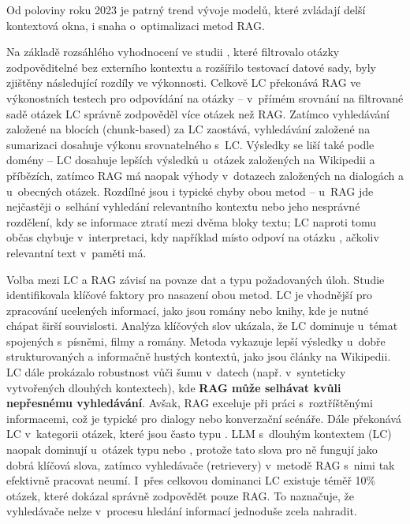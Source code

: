 \documentclass[czech, bc, kiv, he, iso690numb, pdf]{fasthesis}
\begin{document}
Od poloviny roku 2023 je patrný trend vývoje modelů, které zvládají delší kontextová okna, i snaha o~optimalizaci metod RAG.

Na základě rozsáhlého vyhodnocení ve studii \cite{rag-vs-lc-eval}, které filtrovalo otázky zodpověditelné bez externího kontextu a rozšířilo testovací datové sady, byly zjištěny následující rozdíly ve výkonnosti. Celkově LC překonává RAG ve výkonostních testech pro odpovídání na otázky -- v~přímém srovnání na filtrované sadě otázek LC správně zodpověděl více otázek než RAG. Zatímco vyhledávání založené na blocích (chunk-based) za LC zaostává, vyhledávání založené na sumarizaci dosahuje výkonu srovnatelného s~LC. Výsledky se liší také podle domény -- LC dosahuje lepších výsledků u~otázek založených na Wikipedii a příbězích, zatímco RAG má naopak výhody v~dotazech založených na dialogách a u~obecných otázek. Rozdílné jsou i typické chyby obou metod -- u~RAG jde nejčastěji o~selhání vyhledání relevantního kontextu nebo jeho nesprávné rozdělení, kdy se informace ztratí mezi dvěma bloky textu; LC naproti tomu občas chybuje v~interpretaci, kdy například místo  odpoví na otázku , ačkoliv relevantní text v~paměti má.


Volba mezi LC a RAG závisí na povaze dat a typu požadovaných úloh. Studie \cite{rag-vs-lc-eval} identifikovala klíčové faktory pro nasazení obou metod. LC je vhodnější pro zpracování ucelených informací, jako jsou romány nebo knihy, kde je nutné chápat širší souvislosti. Analýza klíčových slov ukázala, že LC dominuje u~témat spojených s~písněmi, filmy a romány. Metoda vykazuje lepší výsledky u~dobře strukturovaných a informačně hustých kontextů, jako jsou články na Wikipedii. LC dále prokázalo robustnost vůči šumu v~datech (např. v~synteticky vytvořených dlouhých kontextech), kde \textbf{RAG může selhávat kvůli nepřesnému vyhledávání}. Avšak, RAG exceluje při práci s~roztříštěnými informacemi, což je typické pro dialogy nebo konverzační scénáře. Dále překonává LC v~kategorii otázek, které jsou často typu .
LLM s~dlouhým kontextem (LC) naopak dominují u~otázek typu  nebo , protože tato slova pro ně fungují jako dobrá klíčová slova, zatímco vyhledávače (retrievery) v~metodě RAG s~nimi tak efektivně pracovat neumí.
I~přes celkovou dominanci LC existuje téměř 10\% otázek, které dokázal správně zodpovědět pouze RAG. To naznačuje, že vyhledávače nelze v~procesu hledání informací jednoduše zcela nahradit.
\end{document}
